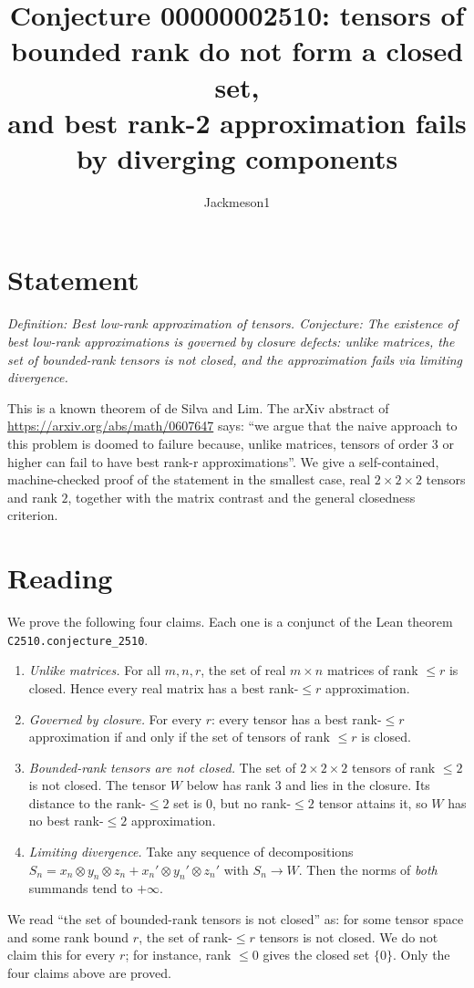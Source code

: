\documentclass[11pt]{article}
\title{Conjecture 00000002510: tensors of bounded rank do not form a closed set,\\ and best rank-2 approximation fails by diverging components}
\author{Jackmeson1}
\date{}
\theoremstyle{definition}
\begin{document}
\maketitle

\section*{Statement}
\emph{Definition: Best low-rank approximation of tensors. Conjecture: The existence of best
low-rank approximations is governed by closure defects: unlike matrices, the set of
bounded-rank tensors is not closed, and the approximation fails via limiting divergence.}

This is a known theorem of de Silva and Lim. The arXiv abstract of
\url{https://arxiv.org/abs/math/0607647} says: ``we argue that the naive approach to this
problem is doomed to failure because, unlike matrices, tensors of order 3 or higher can fail
to have best rank-r approximations''. We give a self-contained, machine-checked proof of the
statement in the smallest case, real $2\times2\times2$ tensors and rank $2$, together with the
matrix contrast and the general closedness criterion.

\section*{Reading}
We prove the following four claims. Each one is a conjunct of the Lean theorem
\texttt{C2510.conjecture\_2510}.
\begin{enumerate}
\item[(R1)] \emph{Unlike matrices.} For all $m,n,r$, the set of real $m\times n$ matrices of
  rank $\le r$ is closed. Hence every real matrix has a best rank-$\le r$ approximation.
\item[(R2)] \emph{Governed by closure.} For every $r$: every tensor has a best rank-$\le r$
  approximation if and only if the set of tensors of rank $\le r$ is closed.
\item[(R3)] \emph{Bounded-rank tensors are not closed.} The set of $2\times2\times2$ tensors
  of rank $\le 2$ is not closed. The tensor $W$ below has rank $3$ and lies in the closure.
  Its distance to the rank-$\le2$ set is $0$, but no rank-$\le2$ tensor attains it, so $W$
  has no best rank-$\le 2$ approximation.
\item[(R4)] \emph{Limiting divergence.} Take any sequence of decompositions
  $S_n = x_n\otimes y_n\otimes z_n + x_n'\otimes y_n'\otimes z_n'$ with $S_n\to W$. Then the
  norms of \emph{both} summands tend to $+\infty$.
\end{enumerate}
We read ``the set of bounded-rank tensors is not closed'' as: for some tensor space and some
rank bound $r$, the set of rank-$\le r$ tensors is not closed. We do not claim this for every
$r$; for instance, rank $\le 0$ gives the closed set $\{0\}$. Only the four claims above are
proved.
\end{document}
